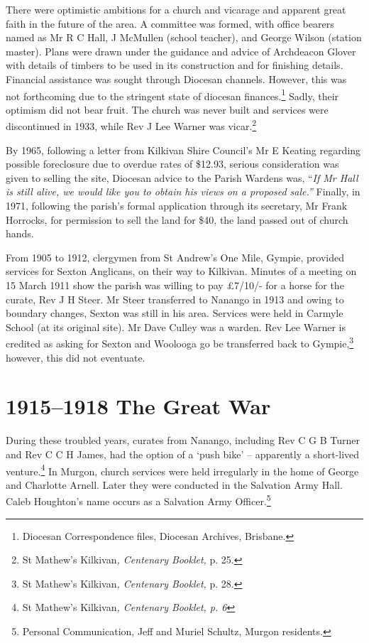 There were optimistic ambitions for a church and vicarage and apparent great faith in the future of the area. A committee was formed, with office bearers named as Mr R C Hall, J McMullen (school teacher), and George Wilson (station master). Plans were drawn under the guidance and advice of Archdeacon Glover with details of timbers to be used in its construction and for finishing details. Financial assistance was sought through Diocesan channels. However, this was not forthcoming due to the stringent state of diocesan finances.\footnote{Diocesan Correspondence files, Diocesan Archives, Brisbane.} Sadly, their optimism did not bear fruit. The church was never built and services were discontinued in 1933, while Rev J Lee Warner was vicar.\footnote{St Mathew's Kilkivan\emph{, Centenary Booklet,} p. 25.}

By 1965, following a letter from Kilkivan Shire Council's Mr E Keating regarding possible foreclosure due to overdue rates of \$12.93, serious consideration was given to selling the site, Diocesan advice to the Parish Wardens was, ``\emph{If Mr Hall is still alive, we would like you to obtain his views on a proposed sale.''} Finally, in 1971, following the parish's formal application through its secretary, Mr Frank Horrocks, for permission to sell the land for \$40, the land passed out of church hands.

From 1905 to 1912, clergymen from St Andrew's One Mile, Gympie, provided services for Sexton Anglicans, on their way to Kilkivan. Minutes of a meeting on 15 March 1911 show the parish was willing to pay £7/10/- for a horse for the curate, Rev J H Steer. Mr Steer transferred to Nanango in 1913 and owing to boundary changes, Sexton was still in his area. Services were held in Carmyle School (at its original site). Mr Dave Culley was a warden. Rev Lee Warner is credited as asking for Sexton and Woolooga go be transferred back to Gympie,\footnote{St Mathew's Kilkivan\emph{, Centenary Booklet,} p. 28.} however, this did not eventuate.

\hypertarget{the-great-war}{%
\section{1915--1918 The Great War}\label{the-great-war}}

During these troubled years, curates from Nanango, including Rev C G B Turner and Rev C C H James, had the option of a `push bike' -- apparently a short-lived venture.\footnote{St Mathew's Kilkivan\emph{, Centenary Booklet, p. 6}} In Murgon, church services were held irregularly in the home of George and Charlotte Arnell. Later they were conducted in the Salvation Army Hall. Caleb Houghton's name occurs as a Salvation Army Officer.\footnote{Personal Communication, Jeff and Muriel Schultz, Murgon residents.}


